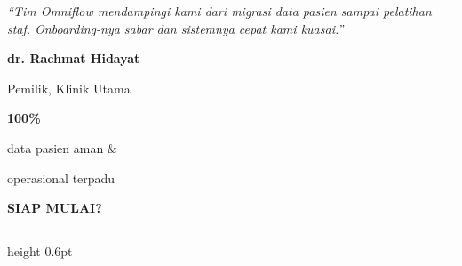 \documentclass[a4paper]{article}
\newcommand{\sectiontitle}[1]{%
    \vspace{10pt}%
    {\fontsize{13}{16}\selectfont\bfseries\color{BlueDark} #1}\par\vspace{3pt}%
    {\color{BluePrimary}\hrule height 0.6pt}\par\vspace{8pt}%
}
\begin{document}
\noindent
\begin{minipage}[t]{0.485\textwidth}
    \colorbox{BlueBg}{%
        \begin{minipage}{\dimexpr\linewidth-2\fboxsep\relax}
            {\fontsize{9.5}{13}\selectfont\color{TextDark}\textit{``Tim Omniflow mendampingi kami dari migrasi data pasien sampai pelatihan staf. Onboarding-nya sabar dan sistemnya cepat kami kuasai.''}}\par\vspace{4pt}
            {\fontsize{8.5}{11}\selectfont\bfseries\color{BluePrimary} dr. Rachmat Hidayat}\par
            {\fontsize{8}{10}\selectfont\color{TextLight} Pemilik, Klinik Utama}
        \end{minipage}}
\end{minipage}%
\hfill
\begin{minipage}[t]{0.485\textwidth}
    \colorbox{BlueBg}{%
        \begin{minipage}{\dimexpr\linewidth-2\fboxsep\relax}
            \begin{center}
                {\fontsize{20}{24}\selectfont\bfseries\color{BluePrimary} 100\%}\par
                {\fontsize{9.5}{12}\selectfont\color{TextDark} data pasien aman \&}\par
                {\fontsize{9.5}{12}\selectfont\color{TextDark} operasional terpadu}
            \end{center}
        \end{minipage}}
\end{minipage}

\sectiontitle{SIAP MULAI?}
\end{document}
